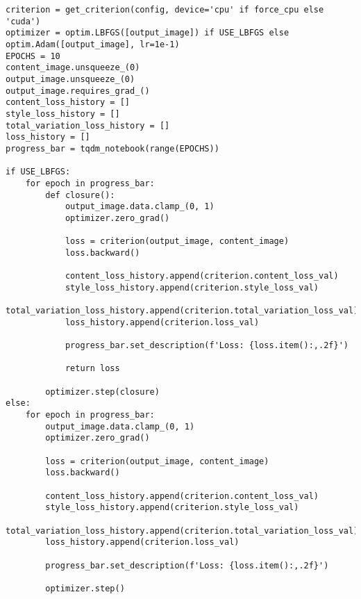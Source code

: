 \begin{listing}[H]
\begin{verbatim}
criterion = get_criterion(config, device='cpu' if force_cpu else 'cuda')
optimizer = optim.LBFGS([output_image]) if USE_LBFGS else optim.Adam([output_image], lr=1e-1)
EPOCHS = 10
content_image.unsqueeze_(0)
output_image.unsqueeze_(0)
output_image.requires_grad_()
content_loss_history = []
style_loss_history = []
total_variation_loss_history = []
loss_history = []
progress_bar = tqdm_notebook(range(EPOCHS))

if USE_LBFGS:
    for epoch in progress_bar:
        def closure():
            output_image.data.clamp_(0, 1)
            optimizer.zero_grad()

            loss = criterion(output_image, content_image)
            loss.backward()
            
            content_loss_history.append(criterion.content_loss_val)
            style_loss_history.append(criterion.style_loss_val)
            total_variation_loss_history.append(criterion.total_variation_loss_val)
            loss_history.append(criterion.loss_val)

            progress_bar.set_description(f'Loss: {loss.item():,.2f}')

            return loss

        optimizer.step(closure)
else:
    for epoch in progress_bar:
        output_image.data.clamp_(0, 1)
        optimizer.zero_grad()

        loss = criterion(output_image, content_image)
        loss.backward()
        
        content_loss_history.append(criterion.content_loss_val)
        style_loss_history.append(criterion.style_loss_val)
        total_variation_loss_history.append(criterion.total_variation_loss_val)
        loss_history.append(criterion.loss_val)

        progress_bar.set_description(f'Loss: {loss.item():,.2f}')

        optimizer.step()
\end{verbatim}
\label{lst:notebook_neural_style_transfer_2}
\end{listing}

